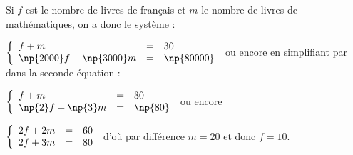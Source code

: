 
\medskip

%
%
%
Si $f$ est le nombre de livres de français et $m$ le nombre de livres de mathématiques, on a donc le système :

$\left\{\begin{array}{l c l}
f + m&=&30\\
\np{2000}f + \np{3000}m&=&\np{80000}
\end{array}\right.$ ou encore en simplifiant par  dans la seconde équation :

$\left\{\begin{array}{l c l}
f + m&=&30\\
\np{2}f + \np{3}m&=&\np{80}
\end{array}\right.$  ou encore 

$\left\{\begin{array}{l c l}
2f + 2m&=&60\\
2f + 3m&=&80
\end{array}\right.$ d’où par différence $m = 20$ et donc $f = 10$.
\vspace{0,5cm}


